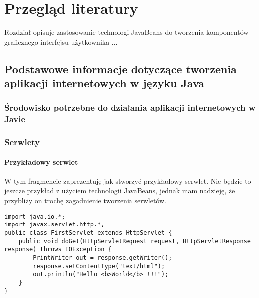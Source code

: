 \chapter{Przegląd literatury}
Rozdział opisuje zastosowanie technologi JavaBeans do tworzenia komponentów
graficznego interfejsu użytkownika ...


\section{Podstawowe informacje dotyczące tworzenia aplikacji internetowych w języku Java}

\subsection{Środowisko potrzebne do działania aplikacji internetowych w Javie}

\subsection{Serwlety}

\subsubsection{Przykładowy serwlet}

W tym fragmencie zaprezentuję jak stworzyć przykładowy serwlet. Nie będzie to jeszcze przykład z użyciem technologii JavaBeans, jednak mam nadzieję, że przybliży on trochę zagadnienie tworzenia serwletów.

\begin{lstlisting}[caption={[Przykładowy serwlet]Przykładowy serwlet}]
import java.io.*;
import javax.servlet.http.*;
public class FirstServlet extends HttpServlet {
	public void doGet(HttpServletRequest request, HttpServletResponse response) throws IOException {
		PrintWriter out = response.getWriter();
		response.setContentType("text/html");
		out.println("Hello <b>World</b> !!!");
	}
}
\end{lstlisting}